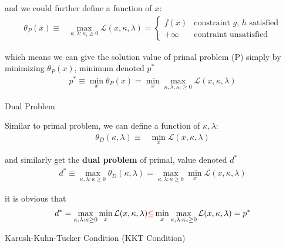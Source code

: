         
    and we could further define a function of $ x $:
\begin{align}
    \theta _P(x)\equiv& \mathop{\max}\limits_{\kappa ,\lambda :\kappa _i\geq 0}\mathcal{L}(x,\kappa ,\lambda ) =\begin{cases}
            f(x)&\text{constraint } g,\,h \text{ satisfied}\\
            +\infty &\text{contraint unsatisfied}
        \end{cases}
\end{align}
       
    which means we can give the solution value of primal problem (P) simply by minimizing $ \theta _P(x) $, minimum denoted $ p^* $
    \begin{align}
        p^* \equiv \mathop{\min}\limits_{x}\theta _P(x)=\mathop{\min}\limits_{x}  \mathop{\max}\limits_{\kappa ,\lambda :\kappa _i\geq 0}\mathcal{L}(x,\kappa ,\lambda )
    \end{align}
    
\begin{point}
    Dual Problem
\end{point}

    Similar to primal problem, we can define a function of $ \kappa ,\lambda  $:
\begin{align}
    \theta _D(\kappa ,\lambda )\equiv&\mathop{\min}\limits_{x} \mathcal{L}(x,\kappa ,\lambda )
\end{align}

    and similarly get the \textbf{dual problem} of primal, value denoted $ d^* $
\begin{align}
    d^*\equiv\max_{\kappa ,\lambda :\kappa \geq 0}\theta _D(\kappa ,\lambda )=\max_{\kappa ,\lambda :\kappa \geq 0}\mathop{\min}\limits_{x} \mathcal{L}(x,\kappa ,\lambda )
\end{align} 
    
    it is obvious that 
    \begin{align}
        d^*= \max_{\kappa ,\lambda :\kappa \geq 0}\mathop{\min}\limits_{x} \mathcal{L}(x,\kappa ,\lambda ){\color{red}\leq }\mathop{\min}\limits_{x}  \mathop{\max}\limits_{\kappa ,\lambda :\kappa _i\geq 0}\mathcal{L}(x,\kappa ,\lambda )=p^*
    \end{align}
    
\begin{point}
    Karush-Kuhn-Tucker Condition (KKT Condition)
\end{point}

